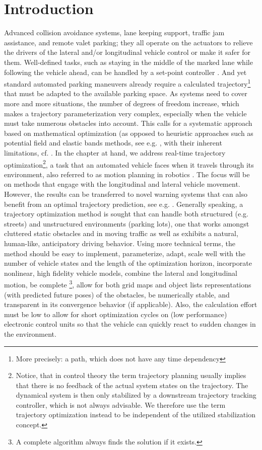 \section{Introduction}\label{S:57.1}

Advanced collision avoidance systems, lane keeping support, traffic jam assistance, and remote valet parking; they all operate on the actuators to relieve the drivers of the lateral and/or longitudinal vehicle control or make it safer for them. Well-defined tasks, such as staying in the middle of the marked lane while following the vehicle ahead, can be handled by a set-point controller \cite{handbuchFAS_Gayko2012}. And yet standard automated parking maneuvers already require a calculated trajectory\footnote{More precisely: a path, which does not have any time dependency} that must be adapted to the available parking space. As systems need to cover more and more situations, the number of degrees of freedom increase, which makes a trajectory parameterization very complex, especially when the vehicle must take numerous obstacles into account. This calls for a systematic approach based on mathematical optimization (as opposed to heuristic approaches such as potential field and elastic bands methods, see e.g. \cite{krogh1984generalized, Brandt2008}, with their inherent limitations, cf. \cite{koren1991potential}.
In the chapter at hand, we address real-time trajectory optimization\footnote{Notice, that in control theory the term trajectory planning usually implies that there is no feedback of the actual system states on the trajectory. The dynamical system is then only stabilized by a downstream trajectory tracking controller, which is not always advisable. We therefore use the term trajectory optimization instead to be independent of the utilized stabilization concept.}, a task that an automated vehicle faces when it travels through its environment, also referred to as motion planning in robotics \cite{latombe1990robot, lavalle2006pa}. The focus will be on methods that engage with the longitudinal and lateral vehicle movement. However, the results can be transferred to novel warning systems that can also
benefit from an optimal trajectory prediction, see e.g. \cite{eichhorn2013Maneuverprediction}. 
Generally speaking, a trajectory optimization method is sought that can handle both structured (e.g. streets) and unstructured environments (parking lots), one that works amongst cluttered static obstacles and in moving traffic as well as exhibits a natural, human-like, anticipatory driving behavior.
Using more technical terms, the method should be easy to implement, parameterize, adapt, scale well with the number of vehicle states and the length of the optimization horizon, incorporate nonlinear, high fidelity vehicle models, combine the lateral and longitudinal motion, be complete \footnote{A complete algorithm always finds the solution if it exists.}, allow for both grid maps and object lists representations (with predicted future poses) of the obstacles, be numerically stable, and transparent in its convergence behavior (if applicable). Also, the calculation effort must be low to allow for short optimization cycles on (low performance) electronic control units so that the vehicle can quickly react to sudden changes in the environment.
